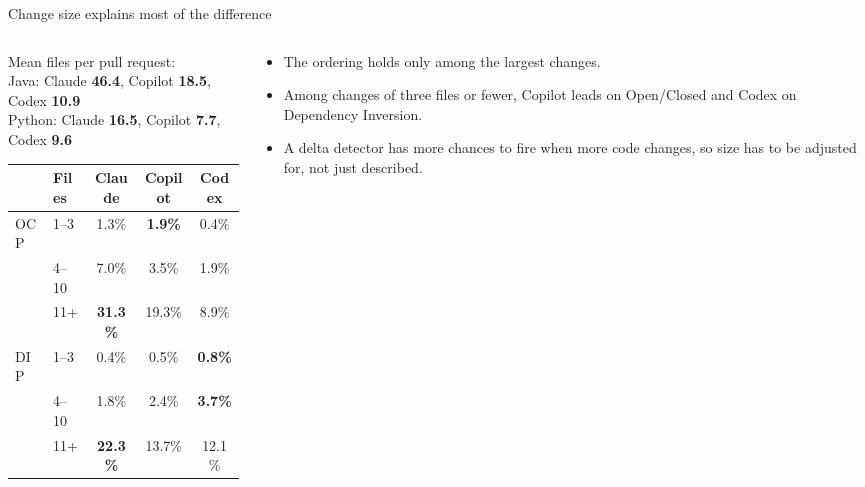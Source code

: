 \documentclass[11pt,aspectratio=169]{beamer}
\begin{document}
\begin{frame}{Change size explains most of the difference}
\begin{columns}[T,onlytextwidth]
\begin{column}{0.52\textwidth}
\small
Mean files per pull request:\\[3pt]
Java: Claude \textbf{46.4}, Copilot \textbf{18.5}, Codex \textbf{10.9}\\
Python: Claude \textbf{16.5}, Copilot \textbf{7.7}, Codex \textbf{9.6}\\[6pt]
\footnotesize
\begin{tabular}{@{}llccc@{}}
\toprule
& \textbf{Files} & \textbf{Claude} & \textbf{Copilot} & \textbf{Codex} \\
\midrule
OCP & 1--3 & 1.3\% & \textbf{1.9\%} & 0.4\% \\
    & 4--10 & 7.0\% & 3.5\% & 1.9\% \\
    & 11+ & \textbf{31.3\%} & 19.3\% & 8.9\% \\
DIP & 1--3 & 0.4\% & 0.5\% & \textbf{0.8\%} \\
    & 4--10 & 1.8\% & 2.4\% & \textbf{3.7\%} \\
    & 11+ & \textbf{22.3\%} & 13.7\% & 12.1\% \\
\bottomrule
\end{tabular}
\end{column}
\begin{column}{0.44\textwidth}
\begin{itemize}\setlength{\itemsep}{4pt}\small
  \item The ordering holds only among the largest changes.
  \item Among changes of three files or fewer, Copilot leads on Open/Closed and Codex on Dependency
        Inversion.
  \item A delta detector has more chances to fire when more code changes, so size has to be
        adjusted for, not just described.
\end{itemize}
\end{column}
\end{columns}
\end{frame}
\end{document}
